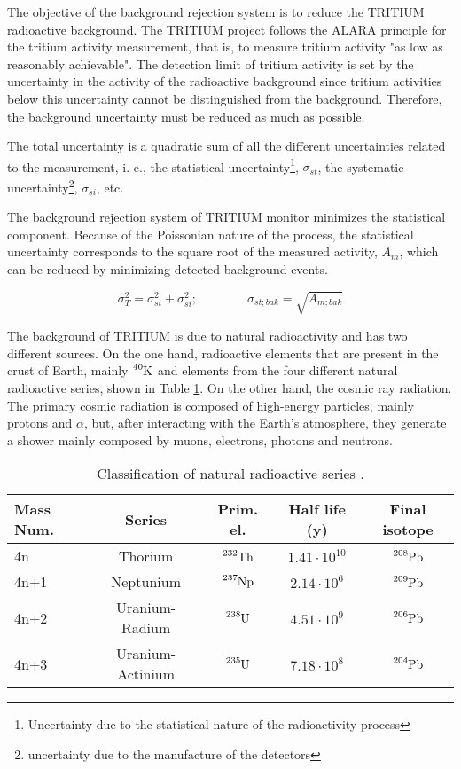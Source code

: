 The objective of the background rejection system is to reduce the TRITIUM radioactive background. The TRITIUM project follows the ALARA principle for the tritium activity measurement, that is, to measure tritium activity "as low as reasonably achievable". The detection limit of tritium activity is set by the uncertainty in the activity of the radioactive background since tritium activities below this uncertainty cannot be distinguished from the background. Therefore, the background uncertainty must be reduced as much as possible.

The total uncertainty is a quadratic sum of all the different uncertainties related to the measurement, i. e., the statistical uncertainty\footnote{Uncertainty due to the statistical nature of the radioactivity process}, $\sigma_{st}$, the systematic uncertainty\footnote{uncertainty due to the manufacture of the detectors}, $\sigma_{si}$, etc.

The background rejection system of TRITIUM monitor minimizes the statistical component. Because of the Poissonian nature of the process, the statistical uncertainty corresponds to the square root of the measured activity, $A_{m}$, which can be reduced by minimizing detected background events.

\begin{equation}
\sigma_{T}^2 = \sigma_{st}^2 +\sigma_{si}^2; \qquad \qquad \sigma_{st;bak} = \sqrt{A_{m;bak}}
\label{eq:SquareSumUncerainty}
\end{equation} 

The background of TRITIUM is due to natural radioactivity and has two different sources. On the one hand, radioactive elements that are present in the crust of Earth, mainly $\ce{^{40}K}$ and elements from the four different natural radioactive series, shown in Table \ref{tab:NaturalRadioactiveSeries}. On the other hand, the cosmic ray radiation. The primary cosmic radiation is composed of high-energy particles, mainly protons and $\alpha$, but, after interacting with the Earth's atmosphere, they generate a shower mainly composed by muons, electrons, photons and neutrons.

\begin{table}[htbp]
\centering{}%
\begin{tabular}{lcccc}
\toprule 
Mass Num. & Series & Prim. el. & Half life (y) & Final isotope \tabularnewline
\midrule
\midrule 
4n & Thorium & $\ce{^{232}Th}$ & $1.41 \cdot{} 10^{10}$ & $\ce{^{208}Pb}$ \tabularnewline
4n+1 & Neptunium & $\ce{^{237}Np}$ & $2.14 \cdot{} 10^{6}$ & $\ce{^{209}Pb}$ \tabularnewline
4n+2 & Uranium-Radium & $\ce{^{238}U}$ & $4.51 \cdot{} 10^{9}$ & $\ce{^{206}Pb}$ \tabularnewline
4n+3 & Uranium-Actinium & $\ce{^{235}U}$ & $7.18 \cdot{} 10^{8}$ & $\ce{^{204}Pb}$ \tabularnewline
\bottomrule
\end{tabular}
\caption{Classification of natural radioactive series \cite{NaturalRadioactiveSeries1, NaturalRadioactiveSeries2}.}
\label{tab:NaturalRadioactiveSeries}
\end{table}

